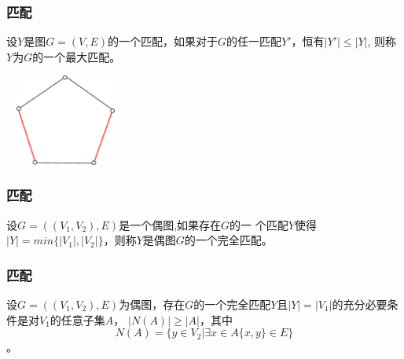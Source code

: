 \documentclass{beamer}
\begin{document}
\begin{CJK*}{UTF8}{gbsn}
\begin{frame}
  \frametitle{匹配}
    \begin{definition6.4.6}
   设$Y$是图$G=(V,E)$的一个匹配，如果对于$G$的任一匹配$Y'$，恒有$|Y'|\leq |Y|$, 则称$Y$为$G$的一个\alert{最大匹配}。
  \end{definition6.4.6}
\pause
\centering
\includegraphics[width=4cm,height=3cm]{maximum}
\end{frame}
\begin{frame}
  \frametitle{匹配}
  \begin{definition6.4.7}
    设$G=((V_1,V_2),E)$是一个偶图,如果存在$G$的一
    个匹配$Y$使得$|Y|=min\{|V_1|,|V_2|\}$，则称$Y$是偶图$G$的一个\alert{完全匹配}。
  \end{definition6.4.7}
\end{frame}

\begin{frame}
  \frametitle{匹配}
  \begin{theorem6.4.3}
    设$G=((V_1,V_2),E)$为偶图，存在$G$的一个完全匹配$Y$且$|Y| = |V_1|$的充分必要条件是对$V_1$的任意子集$A$， $|N(A)| \geq |A|$，其中\[N(A) = \{y\in V_2|\exists x \in A \{x,y\} \in E\}\]。
  \end{theorem6.4.3}
\end{frame}
  

\end{CJK*}
\end{document}
